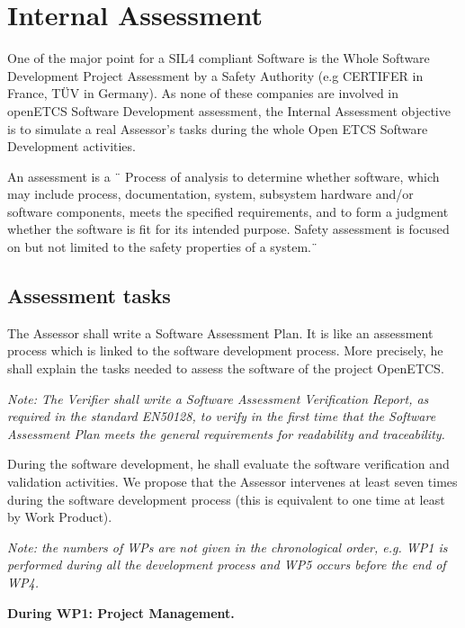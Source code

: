 \section{Internal Assessment}
One of the major point for a SIL4 compliant Software is the Whole Software Development Project Assessment by a Safety Authority (e.g CERTIFER in France, TÜV in Germany). As none of these companies are involved in openETCS Software Development assessment, the Internal Assessment objective is to simulate a real Assessor's tasks during the whole Open ETCS Software Development activities.

An assessment is a ¨ Process of analysis to determine whether software, which may include process, documentation, system, subsystem hardware and/or software components, meets the specified requirements, and to form a judgment whether the software is fit for its intended purpose. Safety assessment is focused on but not limited to the safety properties of a system.¨
\subsection{Assessment tasks}
The Assessor shall write a Software Assessment Plan. It is like an assessment process which is linked to the software development process.
More precisely, he shall explain the tasks needed to assess the software of the project OpenETCS.

{\itshape 
Note: The Verifier shall write a Software Assessment Verification Report, as required in the standard EN50128, to verify in the first time that the Software Assessment Plan meets the general requirements for readability and traceability.
}

During the software development, he shall evaluate the software verification and validation activities.
We propose that the Assessor intervenes at least seven times during the software development process (this is equivalent to one time at least by Work Product).

\textit{
Note: the numbers of WPs are not given in the chronological order, e.g. WP1 is performed during all the development process and WP5 occurs before the end of WP4.
}


\textbf{
During WP1: Project Management.
}

